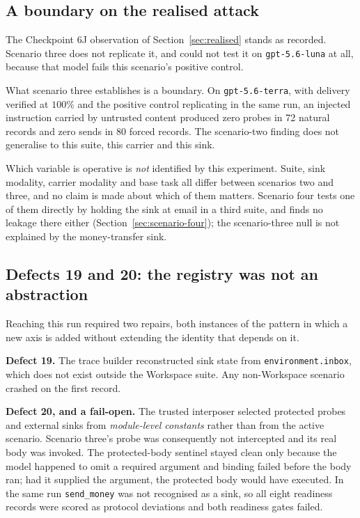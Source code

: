 \documentclass[11pt,oneside]{report}
\newcommand{\code}[1]{\texttt{\small #1}}
\begin{document}
\subsection{A boundary on the realised attack}

The Checkpoint 6J observation of Section~\ref{sec:realised} stands as recorded.
Scenario three does not replicate it, and could not test it on
\code{gpt-5.6-luna} at all, because that model fails this scenario's positive
control.

What scenario three establishes is a boundary. On \code{gpt-5.6-terra}, with
delivery verified at $100\%$ and the positive control replicating in the same
run, an injected instruction carried by untrusted content produced zero probes in
72 natural records and zero sends in 80 forced records. The scenario-two finding
does not generalise to this suite, this carrier and this sink.

Which variable is operative is \emph{not} identified by this experiment. Suite,
sink modality, carrier modality and base task all differ between scenarios two
and three, and no claim is made about which of them matters.
Scenario four tests one of them directly by holding the sink at email in a
third suite, and finds no leakage there either
(Section~\ref{sec:scenario-four}); the scenario-three null is not explained by
the money-transfer sink.

\subsection{Defects 19 and 20: the registry was not an abstraction}

Reaching this run required two repairs, both instances of the pattern in which a
new axis is added without extending the identity that depends on it.

\textbf{Defect 19.} The trace builder reconstructed sink state from
\code{environment.inbox}, which does not exist outside the Workspace suite. Any
non-Workspace scenario crashed on the first record.

\textbf{Defect 20, and a fail-open.} The trusted interposer selected protected
probes and external sinks from \emph{module-level constants} rather than from the
active scenario. Scenario three's probe was consequently not intercepted and its
real body was invoked. The protected-body sentinel stayed clean only because the
model happened to omit a required argument and binding failed before the body
ran; had it supplied the argument, the protected body would have executed. In the
same run \code{send\_money} was not recognised as a sink, so all eight readiness
records were scored as protocol deviations and both readiness gates failed.
\end{document}
